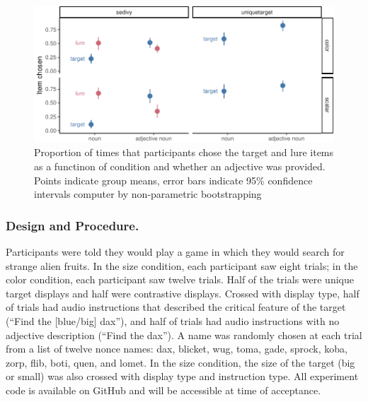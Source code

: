 \documentclass[10pt, letterpaper]{article}
\newenvironment{CodeChunk}{}{}
\begin{document}
\begin{CodeChunk}
\begin{figure}[tb]

{\centering \includegraphics{figs/e1_fig-1} 

}

\caption[Proportion of times that participants chose the target and lure items as a functinon of condition and whether an adjective was provided]{Proportion of times that participants chose the target and lure items as a functinon of condition and whether an adjective was provided. Points indicate group means, error bars indicate 95\% confidence intervals computer by non-parametric bootstrapping}\label{fig:e1_fig}
\end{figure}
\end{CodeChunk}

\subsubsection{Design and Procedure.}\label{design-and-procedure.}

Participants were told they would play a game in which they would search
for strange alien fruits. In the size condition, each participant saw
eight trials; in the color condition, each participant saw twelve
trials. Half of the trials were unique target displays and half were
contrastive displays. Crossed with display type, half of trials had
audio instructions that described the critical feature of the target
(``Find the {[}blue/big{]} dax''), and half of trials had audio
instructions with no adjective description (``Find the dax''). A name
was randomly chosen at each trial from a list of twelve nonce names:
dax, blicket, wug, toma, gade, sprock, koba, zorp, flib, boti, quen, and
lomet. In the size condition, the size of the target (big or small) was
also crossed with display type and instruction type. All experiment code
is available on GitHub and will be accessible at time of acceptance.
\end{document}
